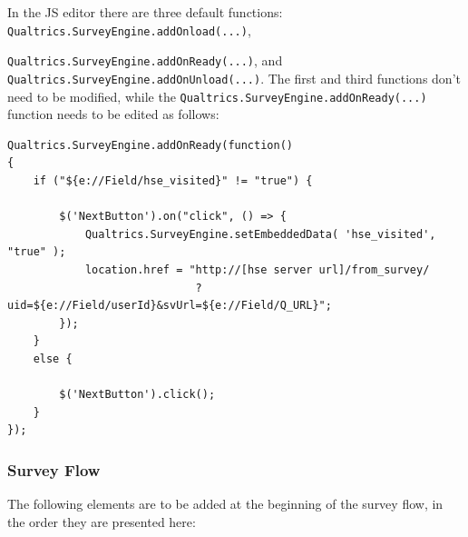 \documentclass[fleqn]{article}
\begin{document}
\newpage

In the JS editor there are three default functions: \texttt{Qualtrics.SurveyEngine.addOnload(...)}, 

\texttt{Qualtrics.SurveyEngine.addOnReady(...)},
and \texttt{Qualtrics.SurveyEngine.addOnUnload(...)}. The first and third functions don't need to be modified, while the
\texttt{Qualtrics.SurveyEngine.addOnReady(...)} function needs to be edited as follows:


\begin{verbatim}
Qualtrics.SurveyEngine.addOnReady(function()
{
    if ("${e://Field/hse_visited}" != "true") {

        $('NextButton').on("click", () => {
            Qualtrics.SurveyEngine.setEmbeddedData( 'hse_visited', "true" );
            location.href = "http://[hse server url]/from_survey/ 
                             ?uid=${e://Field/userId}&svUrl=${e://Field/Q_URL}";				   
        });
    }
    else {

        $('NextButton').click();					  
    }					  
});
\end{verbatim}

\subsubsection{Survey Flow}

The following elements are to be added at the beginning of the survey flow, in the order they are presented here:
\end{document}
